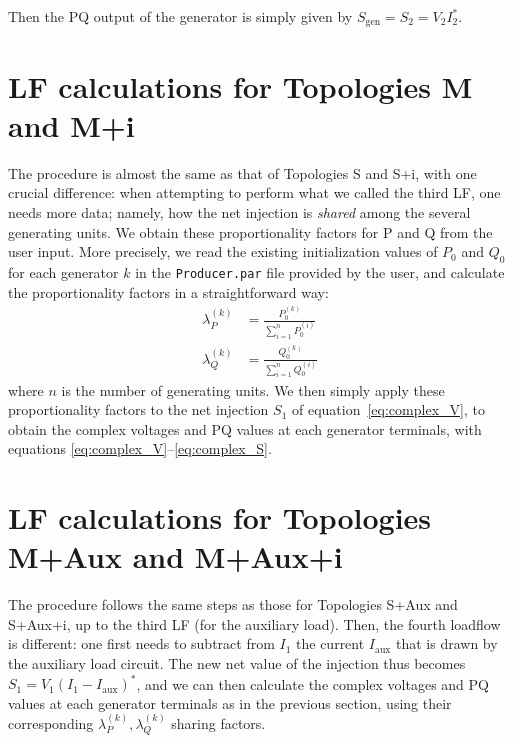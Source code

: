 \documentclass[a4paper,11pt]{article}
\newcommand{\code}[1]{\texttt{#1}}  %
\newcommand{\Sgen}{\ensuremath{S_{\textrm{gen}}}}
\begin{document}
Then the PQ output of the generator is simply given by $\Sgen = S_2 = V_2
I_2^*$.




\section{LF calculations for Topologies M and M+i}

The procedure is almost the same as that of Topologies S and S+i, with one crucial
difference: when attempting to perform what we called the third LF, one needs more data;
namely, how the net injection is \emph{shared} among the several generating units. We
obtain these proportionality factors for P and Q from the user input. More precisely, we
read the existing initialization values of $P_0$ and $Q_0$ for each generator $k$ in the
\code{Producer.par} file provided by the user, and calculate the proportionality factors
in a straightforward way:
\begin{equation}
  \begin{split}
    \lambda_P^{(k)} & = \frac{P_0^{(k)}}{\sum_{i=1}^n P_0^{(i)}} \\
    \lambda_Q^{(k)} & = \frac{Q_0^{(k)}}{\sum_{i=1}^n Q_0^{(i)}}
  \end{split}
\end{equation}
where $n$ is the number of generating units. We then simply apply these proportionality
factors to the net injection $S_1$ of equation~\eqref{eq:complex_V}, to obtain the
complex voltages and PQ values at each generator terminals, with equations
\eqref{eq:complex_V}--\eqref{eq:complex_S}.




\section{LF calculations for Topologies M+Aux and M+Aux+i}

The procedure follows the same steps as those for Topologies S+Aux and S+Aux+i, up to
the third LF (for the auxiliary load).  Then, the fourth loadflow is different: one
first needs to subtract from $I_1$ the current $I_{\text{aux}}$ that is drawn by the
auxiliary load circuit. The new net value of the injection thus becomes $S_1 = V_1 (I_1
- I_{\text{aux}})^*$, and we can then calculate the complex voltages and PQ values at
each generator terminals as in the previous section, using their corresponding
$\lambda_P^{(k)}, \lambda_Q^{(k)}$ sharing factors.
\end{document}
